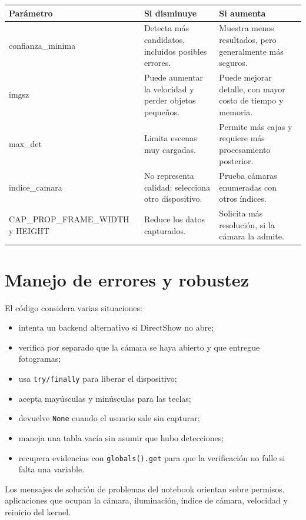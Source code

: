 \documentclass[11pt,a4paper]{article}
\begin{document}
\begin{longtable}{>{\ttfamily\raggedright\arraybackslash}p{}
                  >{\raggedright\arraybackslash}p{}
                  >{\raggedright\arraybackslash}p{}}
\toprule
\textrm{\textbf{Parámetro}} & \textbf{Si disminuye} & \textbf{Si aumenta} \\
\midrule
\endhead
confianza\_minima &
Detecta más candidatos, incluidos posibles errores. &
Muestra menos resultados, pero generalmente más seguros. \\
imgsz &
Puede aumentar la velocidad y perder objetos pequeños. &
Puede mejorar detalle, con mayor costo de tiempo y memoria. \\
max\_det &
Limita escenas muy cargadas. &
Permite más cajas y requiere más procesamiento posterior. \\
indice\_camara &
No representa calidad; selecciona otro dispositivo. &
Prueba cámaras enumeradas con otros índices. \\
CAP\_PROP\_FRAME\_WIDTH y HEIGHT &
Reduce los datos capturados. &
Solicita más resolución, si la cámara la admite. \\
\bottomrule
\end{longtable}

\section{Manejo de errores y robustez}

El código considera varias situaciones:

\begin{itemize}
  \item intenta un backend alternativo si DirectShow no abre;
  \item verifica por separado que la cámara se haya abierto y que entregue
  fotogramas;
  \item usa \texttt{try/finally} para liberar el dispositivo;
  \item acepta mayúsculas y minúsculas para las teclas;
  \item devuelve \texttt{None} cuando el usuario sale sin capturar;
  \item maneja una tabla vacía sin asumir que hubo detecciones;
  \item recupera evidencias con \texttt{globals().get} para que la verificación
  no falle si falta una variable.
\end{itemize}

Los mensajes de solución de problemas del notebook orientan sobre permisos,
aplicaciones que ocupan la cámara, iluminación, índice de cámara, velocidad y
reinicio del kernel.
\end{document}
